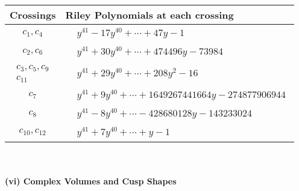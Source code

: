 \documentclass[1p]{elsarticle_modified}
\theoremstyle{definition}
\begin{document}
\begin{tabular}{m{50pt}|m{274pt}}
Crossings & \hspace{64pt}Riley Polynomials at each crossing \\
\hline $$\begin{aligned}c_{1},c_{4}\end{aligned}$$&$\begin{aligned}
&y^{41}-17 y^{40}+\cdots+47 y-1
\end{aligned}$\\
\hline $$\begin{aligned}c_{2},c_{6}\end{aligned}$$&$\begin{aligned}
&y^{41}+30 y^{40}+\cdots+474496 y-73984
\end{aligned}$\\
\hline $$\begin{aligned}c_{3},c_{5},c_{9}\\c_{11}\end{aligned}$$&$\begin{aligned}
&y^{41}+29 y^{40}+\cdots+208 y^2-16
\end{aligned}$\\
\hline $$\begin{aligned}c_{7}\end{aligned}$$&$\begin{aligned}
&y^{41}+9 y^{40}+\cdots+1649267441664 y-274877906944
\end{aligned}$\\
\hline $$\begin{aligned}c_{8}\end{aligned}$$&$\begin{aligned}
&y^{41}-8 y^{40}+\cdots-428680128 y-143233024
\end{aligned}$\\
\hline $$\begin{aligned}c_{10},c_{12}\end{aligned}$$&$\begin{aligned}
&y^{41}+7 y^{40}+\cdots+y-1
\end{aligned}$\\
\hline
\end{tabular}\\~\\
\newpage\flushleft \textbf{(vi) Complex Volumes and Cusp Shapes}
\end{document}
